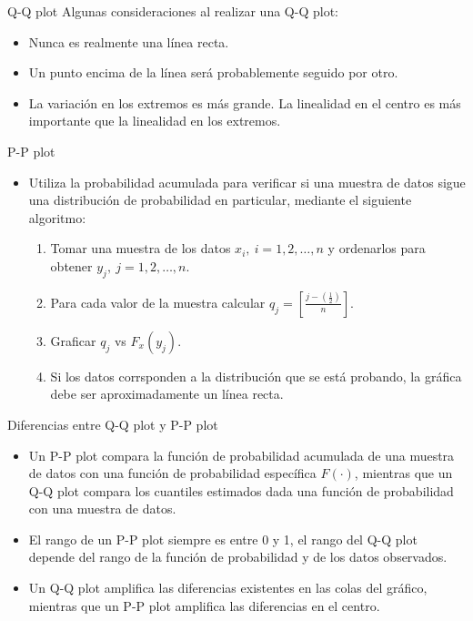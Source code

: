 \begin{frame}{Q-Q plot}
    Algunas consideraciones al realizar una Q-Q plot:
    \begin{itemize}
        \item Nunca es realmente una línea recta.
        \item Un punto encima de la línea será probablemente seguido por otro.
        \item La variación en los extremos es más grande. La linealidad en el centro es más importante que la linealidad en los extremos.
    \end{itemize}
\end{frame}

\begin{frame}{P-P plot}
    \begin{itemize}
        \item Utiliza la probabilidad acumulada para verificar si una muestra de datos sigue una distribución de probabilidad en particular, mediante el siguiente algoritmo:
        \begin{enumerate}
        \item Tomar una muestra de los datos $x_i,~i=1,2,\dots,n$ y ordenarlos para obtener $y_j,~j=1,2,\dots,n$.
        \item Para cada valor de la muestra calcular $q_j=\left[\frac{j-\left(\frac{1}{2}\right)}{n}\right]$.
        \item Graficar $q_j$ vs $F_x(y_j)$.
        \item Si los datos corrsponden a la distribución que se está probando, la gráfica debe ser aproximadamente un línea recta.
    \end{enumerate}
    \end{itemize}
\end{frame}

\begin{frame}{Diferencias entre Q-Q plot y P-P plot}
    \begin{itemize}
        \item Un P-P plot compara la función de probabilidad acumulada de una muestra de datos con una función de probabilidad específica $F(\cdot)$, mientras que un Q-Q plot compara los cuantiles estimados dada una función de probabilidad con una muestra de datos.
        \item El rango de un P-P plot siempre es entre 0 y 1, el rango del Q-Q plot depende del rango de la función de probabilidad y de los datos observados.
        \item Un Q-Q plot amplifica las diferencias existentes en las colas del gráfico, mientras que un P-P plot amplifica las diferencias en el centro.
    \end{itemize}
\end{frame}
